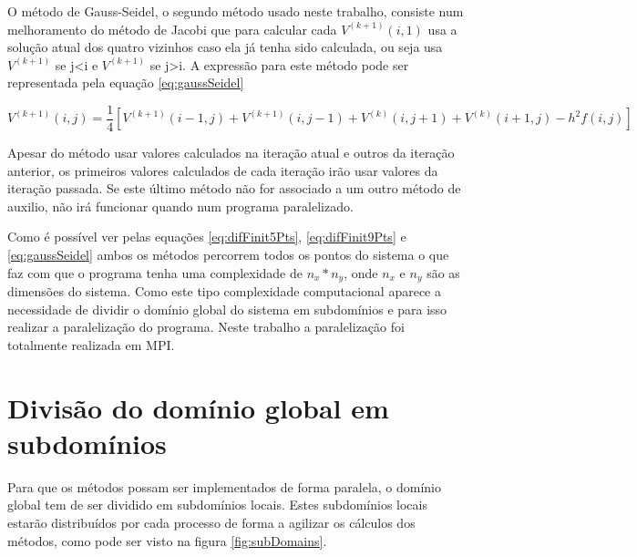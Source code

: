 \documentclass[10pt]{extarticle}
\begin{document}
O método de Gauss-Seidel, o segundo método usado neste trabalho, consiste num melhoramento do método de Jacobi que para calcular cada $V^{(k+1)}(i,1)$ usa a solução atual dos quatro vizinhos caso ela já tenha sido calculada, ou seja usa $V^{(k+1)}$ se j<i e $V^{(k+1)}$ se j>i. A expressão para este método pode ser representada pela equação \ref{eq:gaussSeidel}

  \begin{equation}  \label{eq:gaussSeidel}
   V^{(k+1)}(i,j)=\frac{1}{4}[V^{(k+1)}(i-1,j)+V^{(k+1)}(i,j-1)+V^{(k)}(i,j+1)     	                +V^{(k)}(i+1,j)-h^2f(i,j)]
  \end{equation}
		
Apesar do método usar valores calculados na iteração atual e outros da iteração anterior, os primeiros valores calculados de cada iteração irão usar valores da iteração passada. Se este último método não for associado a um outro método de auxilio, não irá funcionar quando num programa paralelizado.

Como é possível ver pelas equações \ref{eq:difFinit5Pts}, \ref{eq:difFinit9Pts} e \ref{eq:gaussSeidel} ambos os métodos percorrem todos os pontos do sistema o que faz com que o programa tenha uma complexidade de $n_x*n_y$, onde $n_x$ e $n_y$ são as dimensões do sistema. Como este tipo complexidade computacional aparece a necessidade de dividir o domínio global do sistema em subdomínios e para isso realizar a paralelização do programa. Neste trabalho a paralelização foi totalmente realizada em MPI. 

\pagebreak
		
\section{Divisão do domínio global em subdomínios} \label{sec:global2Local}
\label{sec:global2Local}
Para que os métodos possam ser implementados de forma paralela, o domínio global tem de ser dividido em subdomínios locais. Estes subdomínios locais estarão distribuídos por cada processo de forma a agilizar os cálculos dos métodos, como pode ser visto na figura \ref{fig:subDomains}.
\end{document}
